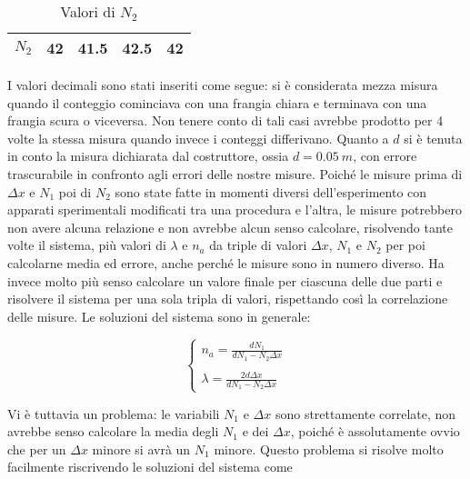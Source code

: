 \documentclass[a4paper,11pt]{article}
\newcommand{\ddfrac}[2]{\ensuremath{\frac{\displaystyle #1}{\displaystyle #2}}}
\begin{document}
\begin{table}[htbp]
  \centering
  \caption{Valori di $N _2$}
    \begin{tabular}{|lrrrr|}
    \bottomrule
    \rowcolor[rgb]{ .267,  .447,  .769} \textcolor[rgb]{ 1,  1,  1}{\textbf{$N _2$}} & \cellcolor[rgb]{ 1,  1,  1} 42 & \cellcolor[rgb]{ 1,  1,  1} 41.5 & \cellcolor[rgb]{ 1,  1,  1} 42.5 & \cellcolor[rgb]{ 1,  1,  1} 42 \\
    \toprule
    \end{tabular}%
  \label{N2}%
\end{table}%

	I valori decimali sono stati inseriti come segue: si è considerata mezza misura quando il conteggio cominciava con una frangia chiara e terminava con una frangia scura o viceversa. Non tenere conto di tali casi avrebbe prodotto per 4 volte la stessa misura quando invece i conteggi differivano. Quanto a $d$ si è tenuta in conto la misura dichiarata dal costruttore, ossia $d = \SI{0.05}{m}$, con errore trascurabile in confronto agli errori delle nostre misure.
	Poiché le misure prima di $\Delta x$ e $N _1$ poi di $N _2$ sono state fatte in momenti diversi dell'esperimento con apparati sperimentali modificati tra una procedura e l'altra, le misure potrebbero non avere alcuna relazione e non avrebbe alcun senso calcolare, risolvendo tante volte il sistema, più valori di $\lambda$ e $n _a$ da triple di valori $\Delta x$, $N _1$ e $N _2$ per poi calcolarne media ed errore, anche perché le misure sono in numero diverso. Ha invece molto più senso calcolare un valore finale per ciascuna delle due parti e risolvere il sistema per una sola tripla di valori, rispettando così la correlazione delle misure.
	Le soluzioni del sistema sono in generale:
	
	\begin{equation}
		\begin{cases}
			n_a = \ddfrac{dN_1}{dN_1 - N_2 \Delta x} \\ \\ \lambda = \ddfrac{2 d \Delta x}{d N _1 - N_2 \Delta x}
		\end{cases}
	\end{equation}

	Vi è tuttavia un problema: le variabili $N _1$ e $\Delta x$ sono strettamente correlate, non avrebbe senso calcolare la media degli $N _1$ e dei $\Delta x$, poiché è assolutamente ovvio che per un $\Delta x$ minore si avrà un $N _1$ minore. Questo problema si risolve molto facilmente riscrivendo le soluzioni del sistema come
	
\end{document}
